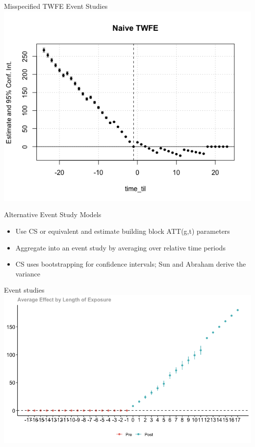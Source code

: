 \documentclass{beamer}
\begin{document}
\begin{frame}{Misspecified TWFE Event Studies }
             \includegraphics[scale=0.45]{./lecture_includes/twfe_eventstudy}

\end{frame}

\begin{frame}{Alternative Event Study Models}

\begin{itemize}

\item Use CS or equivalent and estimate building block ATT(g,t) parameters
\item Aggregate into an event study by averaging over relative time periods
\item CS uses bootstrapping for confidence intervals; Sun and Abraham derive the variance

\end{itemize}

\end{frame}


\begin{frame}{Event studies }
             \includegraphics[scale=0.45]{./lecture_includes/cs_eventstudy}

\end{frame}
\end{document}
